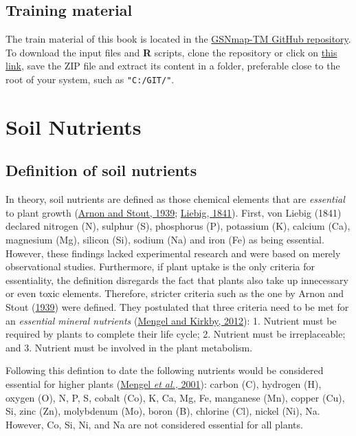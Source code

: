 \documentclass[
  10pt,
  b5paper,
  oneside]{book}
\begin{document}
\hypertarget{training-material}{%
\section{Training material}\label{training-material}}

The train material of this book is located in the \href{https://github.com/FAO-GSP/GSNmap-TM}{GSNmap-TM GitHub repository}. To download the input files and \textbf{R} scripts, clone the repository or click on \href{https://github.com/FAO-GSP/GSNmap-TM/archive/refs/heads/main.zip}{this link}, save the ZIP file and extract its content in a folder, preferable close to the root of your system, such as \texttt{"C:/GIT/"}.

\hypertarget{soil-nutrients}{%
\chapter{Soil Nutrients}\label{soil-nutrients}}

\hypertarget{definition-of-soil-nutrients}{%
\section{Definition of soil nutrients}\label{definition-of-soil-nutrients}}

In theory, soil nutrients are defined as those chemical elements that are \emph{essential} to plant growth (\protect\hyperlink{ref-arnon1939}{Arnon and Stout, 1939}; \protect\hyperlink{ref-vonLiebig1841}{Liebig, 1841}). First, von Liebig (1841) declared nitrogen (N), sulphur (S), phosphorus (P), potassium (K), calcium (Ca), magnesium (Mg), silicon (Si), sodium (Na) and iron (Fe) as being essential. However, these findings lacked experimental research and were based on merely observational studies. Furthermore, if plant uptake is the only criteria for essentiality, the definition disregards the fact that plants also take up innecessary or even toxic elements.
Therefore, stricter criteria such as the one by Arnon and Stout (\protect\hyperlink{ref-arnon1939}{1939}) were defined. They postulated that three criteria need to be met for an \emph{essential mineral nutrients} (\protect\hyperlink{ref-mengel2012}{Mengel and Kirkby, 2012}):
1. Nutrient must be required by plants to complete their life cycle;
2. Nutrient must be irreplaceable; and
3. Nutrient must be involved in the plant metabolism.

Following this defintion to date the following nutrients would be considered essential for higher plants (\protect\hyperlink{ref-mengel2001}{Mengel \emph{et al.}, 2001}): carbon (C), hydrogen (H), oxygen (O), N, P, S, cobalt (Co), K, Ca, Mg, Fe, manganese (Mn), copper (Cu), Si, zinc (Zn), molybdenum (Mo), boron (B), chlorine (Cl), nickel (Ni), Na. However, Co, Si, Ni, and Na are not considered essential for all plants.
\end{document}
